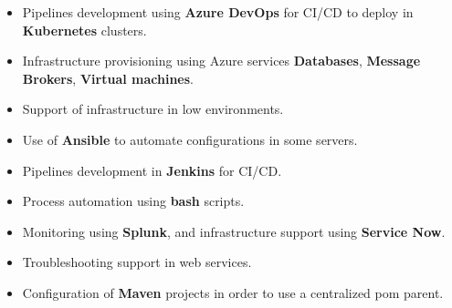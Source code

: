 \documentclass[letterpaper]{style} %
\begin{document}


\begin{itemize}
	\item Pipelines development using \textbf{Azure DevOps} for CI/CD to deploy in \textbf{Kubernetes} clusters.
	\item Infrastructure provisioning using Azure services \textbf{Databases}, \textbf{Message Brokers}, \textbf{Virtual machines}.
	\item Support of infrastructure in low environments.
	\item Use of \textbf{Ansible} to automate configurations in some servers.
\end{itemize}


\divider

\begin{itemize}
	\item Pipelines development in \textbf{Jenkins} for CI/CD.
	\item Process automation using \textbf{bash} scripts.
	\item Monitoring using \textbf{Splunk}, and infrastructure support using \textbf{Service Now}.
	\item Troubleshooting support in web services.
	\item Configuration of \textbf{Maven} projects in order to use a centralized pom parent.
\end{itemize}

\end{document}
